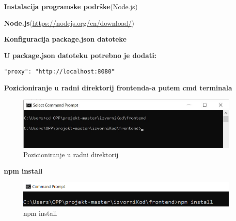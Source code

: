 		   	\noindent {}
		   		\begin{packed_enum}
				
					\item \textbf{Instalacija programske podrške}(Node.js)
    					\begin{packed_item}
                			\item \textbf{Node.js}(\url{https://nodejs.org/en/download/})
                		
    		      \end{packed_item}
					\item \textbf{Konfiguracija package.json datoteke}
					\begin{packed_item}
                			\item \textbf{U package.json datoteku potrebno je dodati: }
                			\begin{verbatim}"proxy": "http://localhost:8080"
                			\end{verbatim}
                		
    		      \end{packed_item}
					
    					
    		            
    		  \item \textbf{Pozicioniranje u radni direktorij frontenda-a putem cmd terminala}
    		            \begin{figure}[H]
    					\includegraphics[scale=1]{slike/frontend/prva.jpg}
    					\centering
    					\caption{Pozicioniranje u radni direktorij}
    					\label{fig:pozicioniranje2}
    		            \end{figure}
    		            
    		 \item \textbf{npm install}
    		            \begin{figure}[H]
    					\includegraphics[scale=0.9]{slike/frontend/treca.png}
    					\centering
    					\caption{npm install}
    					\label{fig:npm install}
    		            \end{figure}
    		            

\end{packed_enum}
